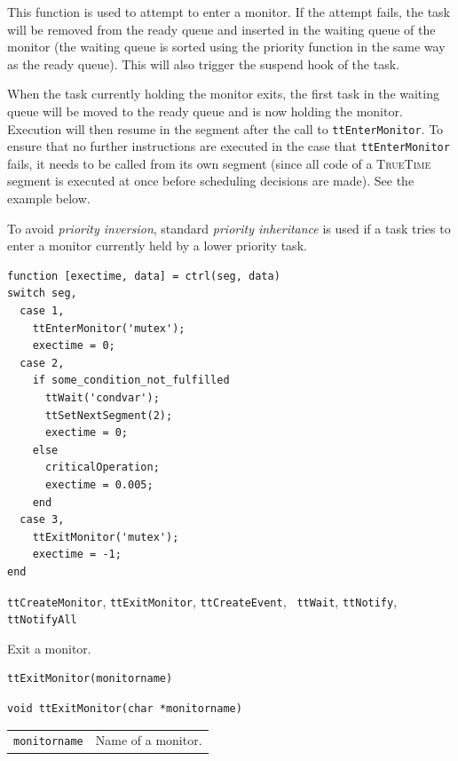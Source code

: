 \documentclass[final,twoside]{rapport}
\begin{document}
\descr This function is used to attempt to enter a monitor. If the
attempt fails, the task will be removed from the ready queue and
inserted in the waiting queue of the monitor (the waiting queue is
sorted using the priority function in the same way as the ready
queue). This will also trigger the suspend hook of the task.

When the task currently holding the monitor exits, the first task in
the waiting queue will be moved to the ready queue and is now holding
the monitor. Execution will then resume in the segment after the call
to \texttt{ttEnterMonitor}. To ensure that no further instructions are
executed in the case that \texttt{ttEnterMonitor} fails, it needs to
be called from its own segment (since all code of a \textsc{TrueTime}
segment is executed at once before scheduling decisions are made). See
the example below.

To avoid \textit{priority inversion}, standard \textit{priority
  inheritance} is used if a task tries to enter a monitor currently
held by a lower priority task.

\example 

\begin{footnotesize}
\begin{verbatim}
function [exectime, data] = ctrl(seg, data)
switch seg,
  case 1, 
    ttEnterMonitor('mutex');
    exectime = 0;
  case 2,
    if some_condition_not_fulfilled
      ttWait('condvar');
      ttSetNextSegment(2);
      exectime = 0;
    else
      criticalOperation;
      exectime = 0.005;
    end
  case 3,
    ttExitMonitor('mutex');
    exectime = -1;
end
\end{verbatim}
\end{footnotesize}

\seealso
{\tt ttCreateMonitor}, {\tt ttExitMonitor}, {\tt ttCreateEvent}, {\tt
  ttWait}, {\tt ttNotify}, {\tt ttNotifyAll}



\purpose
Exit a monitor.

\Msyntax
\begin{verbatim}
ttExitMonitor(monitorname) 
\end{verbatim}

\Csyntax
\begin{verbatim}
void ttExitMonitor(char *monitorname) 
\end{verbatim}

\args
\begin{tabularx}{\hsize}{l>{\raggedright\arraybackslash}X}
  {\tt monitorname} & Name of a monitor.
\end{tabularx}
\end{document}
